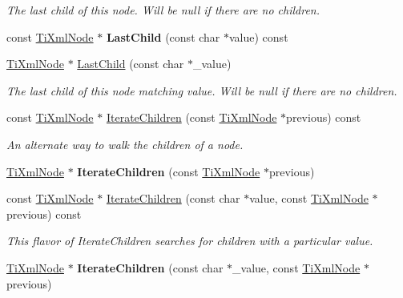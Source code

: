 \begin{DoxyCompactItemize}
\begin{DoxyCompactList}\small\item\em The last child of this node. Will be null if there are no children. \end{DoxyCompactList}\item 
const \hyperlink{class_ti_xml_node}{Ti\+Xml\+Node} $\ast$ {\bfseries Last\+Child} (const char $\ast$value) const \hypertarget{class_ti_xml_node_acdd3fdc436aa7433023310a041e5e63f}{}\label{class_ti_xml_node_acdd3fdc436aa7433023310a041e5e63f}

\item 
\hyperlink{class_ti_xml_node}{Ti\+Xml\+Node} $\ast$ \hyperlink{class_ti_xml_node_abad5bf1059c48127b958711ef89e8e5d}{Last\+Child} (const char $\ast$\+\_\+value)\hypertarget{class_ti_xml_node_abad5bf1059c48127b958711ef89e8e5d}{}\label{class_ti_xml_node_abad5bf1059c48127b958711ef89e8e5d}

\begin{DoxyCompactList}\small\item\em The last child of this node matching \textquotesingle{}value\textquotesingle{}. Will be null if there are no children. \end{DoxyCompactList}\item 
const \hyperlink{class_ti_xml_node}{Ti\+Xml\+Node} $\ast$ \hyperlink{class_ti_xml_node_aaef7ac3978c4bb1cc8a24ffae7bced75}{Iterate\+Children} (const \hyperlink{class_ti_xml_node}{Ti\+Xml\+Node} $\ast$previous) const 
\begin{DoxyCompactList}\small\item\em An alternate way to walk the children of a node. \end{DoxyCompactList}\item 
\hyperlink{class_ti_xml_node}{Ti\+Xml\+Node} $\ast$ {\bfseries Iterate\+Children} (const \hyperlink{class_ti_xml_node}{Ti\+Xml\+Node} $\ast$previous)\hypertarget{class_ti_xml_node_a2358e747118fdbf0e467b1e4f7d03de1}{}\label{class_ti_xml_node_a2358e747118fdbf0e467b1e4f7d03de1}

\item 
const \hyperlink{class_ti_xml_node}{Ti\+Xml\+Node} $\ast$ \hyperlink{class_ti_xml_node_af2b86dbe25d3d26fa48180edc5e2a9fc}{Iterate\+Children} (const char $\ast$value, const \hyperlink{class_ti_xml_node}{Ti\+Xml\+Node} $\ast$previous) const \hypertarget{class_ti_xml_node_af2b86dbe25d3d26fa48180edc5e2a9fc}{}\label{class_ti_xml_node_af2b86dbe25d3d26fa48180edc5e2a9fc}

\begin{DoxyCompactList}\small\item\em This flavor of Iterate\+Children searches for children with a particular \textquotesingle{}value\textquotesingle{}. \end{DoxyCompactList}\item 
\hyperlink{class_ti_xml_node}{Ti\+Xml\+Node} $\ast$ {\bfseries Iterate\+Children} (const char $\ast$\+\_\+value, const \hyperlink{class_ti_xml_node}{Ti\+Xml\+Node} $\ast$previous)\hypertarget{class_ti_xml_node_a67ba8275e533e6f76340236c42ea0aea}{}\label{class_ti_xml_node_a67ba8275e533e6f76340236c42ea0aea}


\end{DoxyCompactItemize}

